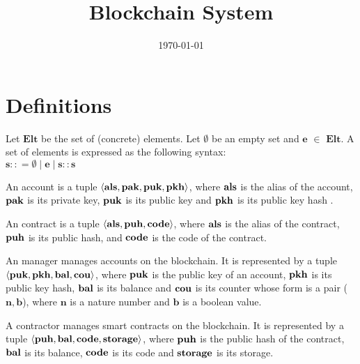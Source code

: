 \documentclass[a4paper]{llncs}
\title{Blockchain System}
\author{}
\institute{}
\date{\today}
\begin{document}
\maketitle


\section{Definitions}
\begin{definition}[Set]
Let $\mathbf{Elt}$ be the set of (concrete) elements. Let $\emptyset$ be an empty set and $\mathbf{e}$ $\in$  $\mathbf{Elt}$. A set of elements is expressed as the following syntax:
\\
$\mathbf{s} :: = \emptyset \mid \mathbf{e} \mid \mathbf{s :: s}$
\end{definition}

\begin{definition}[Account]
An account is a tuple $\langle \textbf{als}, \textbf{pak}, \textbf{puk}, \textbf{pkh} \rangle $, where $\textbf{als}$ is the alias of the account, $\textbf{pak}$ is its private key, $\textbf{puk}$ is its public key and $\textbf{pkh}$ is its public key hash . 
\end{definition}

\begin{definition}[Contract]
An contract is a tuple $\langle  \textbf{als}, \textbf{puh}, \textbf{code} \rangle $, where
$\textbf{als}$ is the alias of the contract, $\textbf{puh}$ is its public hash, and
$\textbf{code}$ is the code of the contract. 
\end{definition}

\begin{definition}[Manager]
An manager manages accounts on the blockchain. It is represented by a
tuple $\langle  \textbf{puk}, \textbf{pkh}, \textbf{bal}, \textbf{cou} \rangle $, where  $\textbf{puk}$ is the
public key of an account, $\textbf{pkh}$ is its public key hash, $\textbf{bal}$ is its
balance and $\textbf{cou}$ is its counter whose form is a pair ($\mathbf{n},
\mathbf{b}$), where $\mathbf{n}$ is a nature number and $\mathbf{b}$
is a boolean value.  
\end{definition}

\begin{definition}[Contractor]
  A contractor manages smart contracts on the blockchain. It is
  represented by a tuple
  $\langle \textbf{puh}, \textbf{bal}, \textbf{code}, \textbf{storage} \rangle $, where $\textbf{puh}$ is the
  public hash of the contract, $\textbf{bal}$ is its balance, $\textbf{code}$ is its
  code and $\textbf{storage}$ is its storage.
\end{definition}
\end{document}
